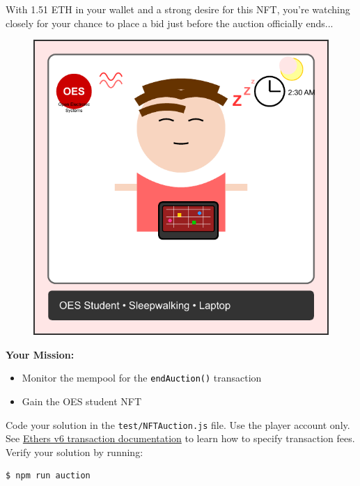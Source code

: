 \documentclass[12pt]{article}
\newcommand{\codegrey}[1]{%
  \texttt{\colorbox{black!4}{\textcolor{black}{#1}}}%
}
\begin{document}
With 1.51 ETH in your wallet and a strong desire for this NFT, you're watching closely for your chance to place a bid just before the auction officially ends...

\begin{figure}[H]
  \centering
  \begin{minipage}{0.3\textwidth}
    \includegraphics[width=\textwidth]{NFTs/oes-student-nft.pdf}
  \end{minipage}
\end{figure}

\medskip
\noindent
\textbf{Your Mission:}
\begin{itemize}
    \item Monitor the mempool for the \codegrey{endAuction()} transaction
    \item Gain the OES student NFT
\end{itemize}

\noindent
Code your solution in the \texttt{test/NFTAuction.js} file. Use the player account only. See \href{https://docs.ethers.org/v6/api/transaction/\#Transaction}{Ethers v6 transaction documentation} to learn how to specify transaction fees. Verify your solution by running:

\begin{verbatim}
$ npm run auction
\end{verbatim}
\end{document}
